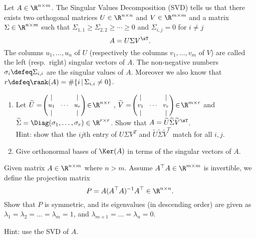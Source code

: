 \documentclass[11pt,nocut]{article}
\begin{document}


\bigskip

\begin{problem}[2 points]
	Let $A \in \R^{n \times m}$. The Singular Values Decomposition (SVD) tells us that there exists two orthogonal matrices $U \in \R^{n \times n}$ and $V \in \R^{m \times m}$ and a matrix $\Sigma \in \R^{n \times m}$ such that $\Sigma_{1,1} \geq \Sigma_{2,2}  \geq \cdots \geq 0$ and $\Sigma_{i,j} = 0$ for $i\neq j$
	$$
	A = U \Sigma V^{\sT}.
	$$
	The columns $u_1, \dots, u_n$ of $U$ (respectively the columns $v_1, \dots, v_m$ of $V$) are called the left (resp.\ right) singular vectors of $A$. The non-negative numbers $\sigma_i \defeq \Sigma_{i,i}$ are the singular values of $A$. Moreover we also know that $r \defeq \rank(A) = \# \{i \, | \, \Sigma_{i,i} \neq 0 \}$.
	\begin{enumerate}[label=\normalfont(\textbf{\alph*})]
		\item Let 
			$\widetilde{U} = \!
			{\small \begin{pmatrix}
					| & & | \\
					u_1 & \!\cdots\! & u_r \\
					| & & | 
			\end{pmatrix} } \! \in \! \R^{n \times r}$ ,
			$\widetilde{V} = \!
			{\small \begin{pmatrix}
					| & & | \\
					v_1 & \!\cdots\! & v_r \\
					| & & | 
			\end{pmatrix} } \! \in \! \R^{m \times r}$ and
			$\widetilde{\Sigma} = \Diag(\sigma_1, \dots, \sigma_r) \in \R^{r \times r}$.
			Show that $A = \widetilde{U}\widetilde{\Sigma}\widetilde{V}^{\sT}$. \\
   Hint: show that the $ij$th entry of $U\Sigma V^T$ and $\tilde{U}\tilde{\Sigma}\tilde{V}^T$ match for all $i,j$.
 		\item Give orthonormal bases of $\Ker(A)$ in terms of the singular vectors of $A$.
	\end{enumerate}
\end{problem}

\vspace{2mm}

\begin{problem}[1 points] 
Given matrix $A\in\R^{n\times m}$ where $n>m$. Assume $A^\top A\in\R^{m\times m}$ is invertible, we define the projection matrix $$P = A(A^\top A)^{-1} A^\top\in\R^{n\times n}.$$
Show that $P$ is symmetric, and its eigenvalues (in descending order) are given as $\lambda_1=\lambda_2=...=\lambda_m=1$, and $\lambda_{m+1}=...=\lambda_n=0$. 


\noindent
Hint: use the SVD of $A$. 
\end{problem}
\end{document}
